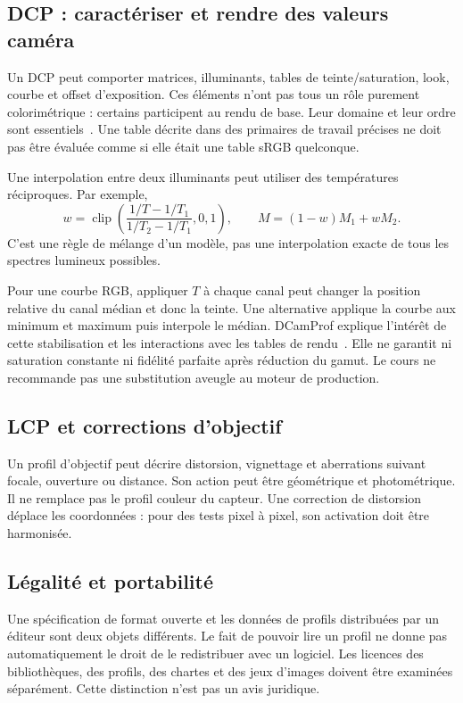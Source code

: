 \subsection{DCP : caractériser et rendre des valeurs caméra}
Un DCP peut comporter matrices, illuminants, tables de
teinte/saturation, look, courbe et offset d'exposition.
Ces éléments n'ont pas tous un rôle purement colorimétrique :
certains participent au rendu de base. Leur domaine et leur
ordre sont essentiels~\cite{dng}. Une table décrite dans
des primaires de travail précises ne doit pas être évaluée
comme si elle était une table sRGB quelconque.

Une interpolation entre deux illuminants peut utiliser
des températures réciproques. Par exemple,
\begin{equation}
w=\operatorname{clip}\left(
\frac{1/T-1/T_1}{1/T_2-1/T_1},0,1\right),\qquad
M=(1-w)M_1+wM_2.
\end{equation}
C'est une règle de mélange d'un modèle, pas une interpolation
exacte de tous les spectres lumineux possibles.

Pour une courbe RGB, appliquer $T$ à chaque canal peut
changer la position relative du canal médian et donc la
teinte. Une alternative applique la courbe aux minimum et
maximum puis interpole le médian. DCamProf explique
l'intérêt de cette stabilisation et les interactions
avec les tables de rendu~\cite{dcamprofimages}. Elle ne
garantit ni saturation constante ni fidélité parfaite
après réduction du gamut. Le cours ne recommande pas
une substitution aveugle au moteur de production.

\subsection{LCP et corrections d'objectif}
Un profil d'objectif peut décrire distorsion, vignettage
et aberrations suivant focale, ouverture ou distance.
Son action peut être géométrique et photométrique. Il ne
remplace pas le profil couleur du capteur. Une correction
de distorsion déplace les coordonnées : pour des tests
pixel à pixel, son activation doit être harmonisée.

\subsection{Légalité et portabilité}
Une spécification de format ouverte et les données de
profils distribuées par un éditeur sont deux objets
différents. Le fait de pouvoir lire un profil ne donne
pas automatiquement le droit de le redistribuer avec
un logiciel. Les licences des bibliothèques, des profils,
des chartes et des jeux d'images doivent être examinées
séparément. Cette distinction n'est pas un avis juridique.

